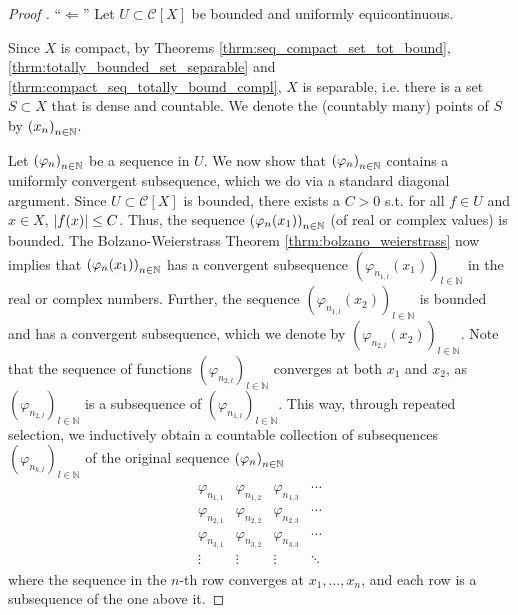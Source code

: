 \begin{proof}[Proof \cite{src:arzela_ascoli_theorem}]
	\enquote{$\Longleftarrow$} Let $U\subset \mathcal C[X]$ be bounded and uniformly equicontinuous. 
	
	Since $X$ is compact, by Theorems \ref{thrm:seq_compact_set_tot_bound}, \ref{thrm:totally_bounded_set_separable} and \ref{thrm:compact_seq_totally_bound_compl}, $X$ is separable, i.e. there is a set $S\subset X$ that is dense and countable. We denote the (countably many) points of $S$ by $\seq[x_n]$.
	
	Let $\seq[\varphi_n]$ be a sequence in $U$. We now show that $\seq[\varphi_n]$ contains a uniformly convergent subsequence, which we do via a standard diagonal argument. Since $U\subset \mathcal C[X]$ is bounded, there exists a $C > 0$ s.t. for all $f\in U$ and $x\in X$, $\abs{f(x)} \leq C$. Thus, the sequence $\seq[\varphi_n(x_1)]$ (of real or complex values) is bounded. The Bolzano-Weierstrass Theorem \ref{thrm:bolzano_weierstrass} now implies that $\seq[\varphi_n(x_1)]$ has a convergent subsequence $\left(\varphi_{n_{1, l}}(x_1)\right)_{l\in\mathbb N}$ in the real or complex numbers. Further, the sequence $\left(\varphi_{n_{1, l}}(x_2)\right)_{l\in\mathbb N}$ is bounded and has a convergent subsequence, which we denote by $\left(\varphi_{n_{2, l}}(x_2)\right)_{l\in\mathbb N}$. Note that the sequence of functions $\left(\varphi_{n_{2, l}}\right)_{l\in\mathbb N}$ converges at both $x_1$ and $x_2$, as $\left(\varphi_{n_{2, l}}\right)_{l\in\mathbb N}$ is a subsequence of $\left(\varphi_{n_{1, l}}\right)_{l\in\mathbb N}$. This way, through repeated selection, we inductively obtain a countable collection of subsequences $\left(\varphi_{n_{k, l}}\right)_{l\in\mathbb N}$ of the original sequence $\seq[\varphi_n]$
	\begin{align*}
		\begin{matrix}
			   \varphi_{n_{1, 1}} & \varphi_{n_{1, 2}} & \varphi_{n_{1, 3}} & \cdots 
			\\ \varphi_{n_{2, 1}} & \varphi_{n_{2, 2}} & \varphi_{n_{2, 3}} & \cdots 
			\\ \varphi_{n_{3, 1}} & \varphi_{n_{3, 2}} & \varphi_{n_{3, 3}} & \cdots 
			\\ \vdots             & \vdots             & \vdots             & \ddots
		\end{matrix}
	\end{align*}
	where the sequence in the $n$-th row converges at $x_1, \dots, x_n$, and each row is a subsequence of the one above it. 
	

\end{proof}
